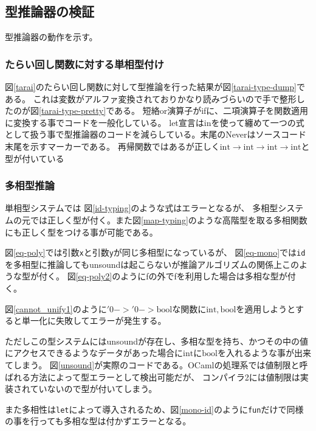 \documentclass[report]{jlreq}
\begin{document}
    \subsection{型推論器の検証}
      型推論器の動作を示す。
      \subsubsection{たらい回し関数に対する単相型付け}
        図\ref{tarai}のたらい回し関数に対して型推論を行った結果が図\ref{tarai-type-dump}である。
        これは変数がアルファ変換されておりかなり読みづらいので手で整形したのが図\ref{tarai-type-pretty}である。
        短絡or演算子がifに、二項演算子を関数適用に変換する事でコードを一般化している。
        let宣言はinを使って纏めて一つの式として扱う事で型推論器のコードを減らしている。末尾のNeverはソースコード末尾を示すマーカーである。
        再帰関数ではあるが正しく$\mathrm{int} \rightarrow \mathrm{int} \rightarrow \mathrm{int} \rightarrow \mathrm{int}$と型が付いている
        
        

      \subsubsection{多相型推論}
        単相型システムでは
        図\ref{id-typing}のような式はエラーとなるが、
        多相型システムの元では正しく型が付く。また図\ref{map-typing}のような高階型を取る多相関数にも正しく型をつける事が可能である。
        
        
        図\ref{eq-poly}では引数\texttt{x}と引数\texttt{y}が同じ多相型になっているが、
        図\ref{eq-mono}では\texttt{id}を多相型に推論してもunsoundは起こらないが推論アルゴリズムの関係上このような型が付く。
        図\ref{eq-poly2}のようにfの外でfを利用した場合は多相な型が付く。
        
        
        
        図\ref{cannot_unify1}のように$'0 -> '0 -> \mathrm{bool}$な関数に$\mathrm{int}, \mathrm{bool}$を適用しようとすると単一化に失敗してエラーが発生する。
        
        ただしこの型システムにはunsoundが存在し、多相な型を持ち、かつその中の値にアクセスできるようなデータがあった場合に$\mathrm{int}$に$\mathrm{bool}$を入れるような事が出来てしまう。
        図\ref{unsound}が実際のコードである。OCamlの処理系では値制限と呼ばれる方法によって型エラーとして検出可能だが、
        コンパイラ2には値制限は実装されていないので型が付いてしまう。
        
        また多相性は\texttt{let}によって導入されるため、図\ref{mono-id}のように\texttt{fun}だけで同様の事を行っても多相な型は付かずエラーとなる。
        
\end{document}
